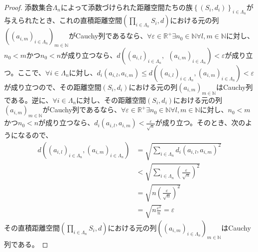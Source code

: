 \documentclass[dvipdfmx]{jsarticle}
\begin{document}
\begin{proof}
添数集合$\varLambda_{n}$によって添数づけられた距離空間たちの族$\left\{ \left( S_{i},d_{i} \right) \right\}_{i \in \varLambda_{n}}$が与えられたとき、これの直積距離空間$\left( \prod_{i \in \varLambda_{n}} S_{i},d \right)$における元の列$\left( \left( a_{i,m} \right)_{i \in \varLambda_{n}} \right)_{m \in \mathbb{N}}$がCauchy列であるなら、$\forall\varepsilon \in \mathbb{R}^{+}\exists n_{0} \in \mathbb{N}\forall l,m \in \mathbb{N}$に対し、$n_{0} < m$かつ$n_{0} < n$が成り立つなら、$d\left( \left( a_{i,l} \right)_{i \in \varLambda_{n}},\ \ \left( a_{i,m} \right)_{i \in \varLambda_{n}} \right) < \varepsilon$が成り立つ。ここで、$\forall i \in \varLambda_{n}$に対し、$d_{i}\left( a_{i,l},a_{i,m} \right) \leq d\left( \left( a_{i,l} \right)_{i \in \varLambda_{n}},\left( a_{i,m} \right)_{i \in \varLambda_{n}} \right) < \varepsilon$が成り立つので、その距離空間$\left( S_{i},d_{i} \right)$における元の列$\left( a_{i,m} \right)_{m \in \mathbb{N}}$はCauchy列である。逆に、$\forall i \in \varLambda_{n}$に対し、その距離空間$\left( S_{i},d_{i} \right)$における元の列$\left( a_{i,m} \right)_{m \in \mathbb{N}}$がCauchy列であるなら、$\forall\varepsilon \in \mathbb{R}^{+}\exists n_{0} \in \mathbb{N}\forall l,m \in \mathbb{N}$に対し、$n_{0} < m$かつ$n_{0} < n$が成り立つなら、$d_{i}\left( a_{i,l},a_{i,m} \right) < \frac{\varepsilon}{\sqrt{n}}$が成り立つ。そのとき、次のようになるので、
\begin{align*}
d\left( \left( a_{i,l} \right)_{i \in \varLambda_{n}},\left( a_{i,m} \right)_{i \in \varLambda_{n}} \right) &= \sqrt{\sum_{i \in \varLambda_{n}} {d_{i}\left( a_{i,l},a_{i,m} \right)}^{2}}\\
&< \sqrt{\sum_{i \in \varLambda_{n}} \left( \frac{\varepsilon}{\sqrt{n}} \right)^{2}}\\
&= \sqrt{n\left( \frac{\varepsilon}{\sqrt{n}} \right)^{2}}\\
&= \sqrt{n\frac{\varepsilon^{2}}{n}} = \varepsilon
\end{align*}
その直積距離空間$\left( \prod_{i \in \varLambda_{n}} S_{i},d \right)$における元の列$\left( \left( a_{i,m} \right)_{i \in \varLambda_{n}} \right)_{m \in \mathbb{N}}$はCauchy列である。\par

\end{proof}
\end{document}
